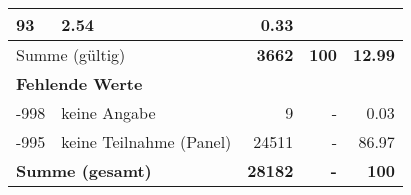 \begin{longtable}{lXrrr}
       \num{93} &
       \num[round-mode=places,round-precision=2]{2.54} &
         \num[round-mode=places,round-precision=2]{0.33} \\
     \midrule
     \multicolumn{2}{l}{Summe (gültig)} &
       \textbf{\num{3662}} &
     \textbf{\num{100}} &
       \textbf{\num[round-mode=places,round-precision=2]{12.99}} \\
     \multicolumn{5}{l}{\textbf{Fehlende Werte}}\\
       -998 &
       keine Angabe &
         \num{9} &
        - &
         \num[round-mode=places,round-precision=2]{0.03} \\
       -995 &
       keine Teilnahme (Panel) &
         \num{24511} &
        - &
         \num[round-mode=places,round-precision=2]{86.97} \\
     \midrule
     \multicolumn{2}{l}{\textbf{Summe (gesamt)}} &
          \textbf{\num{28182}} &
        \textbf{-} &
        \textbf{\num{100}} \\
     \bottomrule
     \end{longtable}
     
